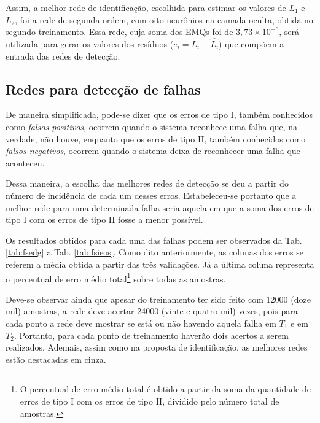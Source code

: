 Assim, a melhor rede de identificação, escolhida para estimar os valores de
$L_1$ e $L_2$, foi a rede de segunda ordem, com oito neurônios na camada oculta,
obtida no segundo treinamento. Essa rede, cuja soma dos EMQs foi de $3,73 \times
10^{-6}$, será utilizada para gerar os valores dos resíduos ($e_i = L_i -
\widehat{L_i}$) que compõem a entrada das redes de detecção.

\subsection{Redes para detecção de falhas}
De maneira simplificada, pode-se dizer que os erros de tipo I, também conhecidos
como {\it falsos positivos}, ocorrem quando o sistema reconhece uma falha que,
na verdade, não houve, enquanto que os erros de tipo II, também conhecidos como
{\it falsos negativos}, ocorrem quando o sistema deixa de reconhecer uma falha
que aconteceu.

Dessa maneira, a escolha das melhores redes de detecção se deu a partir do
número de incidência de cada um desses erros. Estabeleceu-se portanto que a
melhor rede para uma determinada falha seria aquela em que a soma dos erros de
tipo I com os erros de tipo II fosse a menor possível.

Os resultados obtidos para cada uma das falhas podem ser observados da Tab.
\ref{tab:fsedg} a Tab. \ref{tab:fsieos}. Como dito anteriormente, as colunas dos
erros se referem a média obtida a partir das três validações. Já a última coluna
representa o percentual de erro médio total\footnote{O percentual de erro médio
total é obtido a partir da soma da quantidade de erros de tipo I com os erros de
tipo II, dividido pelo número total de amostras.} sobre todas as amostras. 

Deve-se observar ainda que apesar do treinamento ter sido feito com 12000 (doze
mil) amostras, a rede deve acertar 24000 (vinte e quatro mil) vezes, pois para
cada ponto a rede deve mostrar se está ou não havendo aquela falha em $T_1$ e em
$T_2$. Portanto, para cada ponto de treinamento haverão dois acertos a serem
realizados. Ademais, assim como na proposta de identificação, as melhores redes
estão destacadas em cinza.

